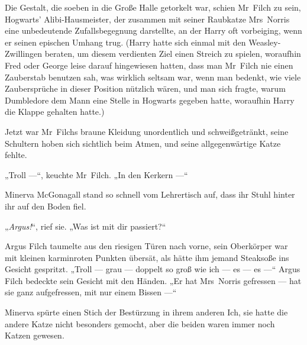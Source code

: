 Die Gestalt, die soeben in die Große Halle getorkelt war, schien Mr~Filch zu sein, Hogwarts’ Alibi-Hausmeister, der zusammen mit seiner Raubkatze Mrs~Norris eine unbedeutende Zufallsbegegnung darstellte, an der Harry oft vorbeiging, wenn er seinen epischen Umhang trug. (Harry hatte sich einmal mit den Weasley-Zwillingen beraten, um diesem verdienten Ziel einen Streich zu spielen, woraufhin Fred oder George leise darauf hingewiesen hatten, dass man Mr~Filch nie einen Zauberstab benutzen sah, was wirklich seltsam war, wenn man bedenkt, wie viele Zaubersprüche in dieser Position nützlich wären, und man sich fragte, warum Dumbledore dem Mann eine Stelle in Hogwarts gegeben hatte, woraufhin Harry die Klappe gehalten hatte.)

Jetzt war Mr~Filchs braune Kleidung unordentlich und schweißgetränkt, seine Schultern hoben sich sichtlich beim Atmen, und seine allgegenwärtige Katze fehlte.

„Troll —“, keuchte Mr~Filch.
„In den Kerkern —“

\later

Minerva McGonagall stand so schnell vom Lehrertisch auf, dass ihr Stuhl hinter ihr auf den Boden fiel.

„\emph{Argus!}“, rief sie.
„Was ist mit dir passiert?“

Argus Filch taumelte aus den riesigen Türen nach vorne, sein Oberkörper war mit kleinen karminroten Punkten übersät, als hätte ihm jemand Steaksoße ins Gesicht gespritzt.
„Troll — grau — doppelt so groß wie ich — es — es —“ Argus Filch bedeckte sein Gesicht mit den Händen.
„Er hat Mrs~Norris gefressen — hat sie ganz aufgefressen, mit nur einem Bissen —“

Minerva spürte einen Stich der Bestürzung in ihrem anderen Ich, sie hatte die andere Katze nicht besonders gemocht, aber die beiden waren immer noch Katzen gewesen.

